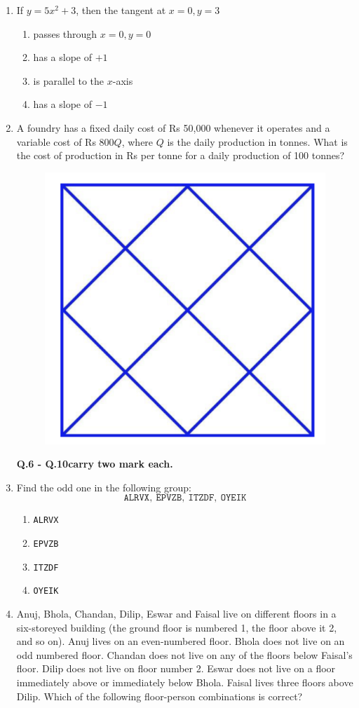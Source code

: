 \documentclass[journal]{IEEEtran}
\begin{document}
\begin{enumerate}
\item If $y = 5x^{2} + 3$, then the tangent at $x = 0, y = 3$

\begin{enumerate}
    \item passes through $x = 0, y = 0$
    \item has a slope of $+1$
    \item is parallel to the $x$-axis
    \item has a slope of $-1$
\end{enumerate}
\hfill{}
\newpage
\item A foundry has a fixed daily cost of Rs 50,000 whenever it operates and a variable cost of Rs $800Q$, where $Q$ is the daily production in tonnes. What is the cost of production in Rs per tonne for a daily production of 100 tonnes?
\begin{figure}[H]
    \centering
    \includegraphics[width=0.5\columnwidth]{Figs/Q5.png}
    \caption{}
    \label{fig:placeholder}
\end{figure}

\textbf{\Large Q.6 - Q.10carry two mark each.}

\item Find the odd one in the following group:
\[
\texttt{ALRVX},\ \texttt{EPVZB},\ \texttt{ITZDF},\ \texttt{OYEIK}
\]

\medskip

\begin{enumerate}
  \item \texttt{ALRVX}
  \item \texttt{EPVZB}
  \item \texttt{ITZDF}
  \item \texttt{OYEIK}
\end{enumerate}
\hfill{}

\item Anuj, Bhola, Chandan, Dilip, Eswar and Faisal live on different floors in a six-storeyed building (the ground floor is numbered 1, the floor above it 2, and so on). Anuj lives on an even-numbered floor. Bhola does not live on an odd numbered floor. Chandan does not live on any of the floors below Faisal's floor. Dilip does not live on floor number 2. Eswar does not live on a floor immediately above or immediately below Bhola. Faisal lives three floors above Dilip. Which of the following floor-person combinations is correct?



\end{enumerate}
\end{document}
